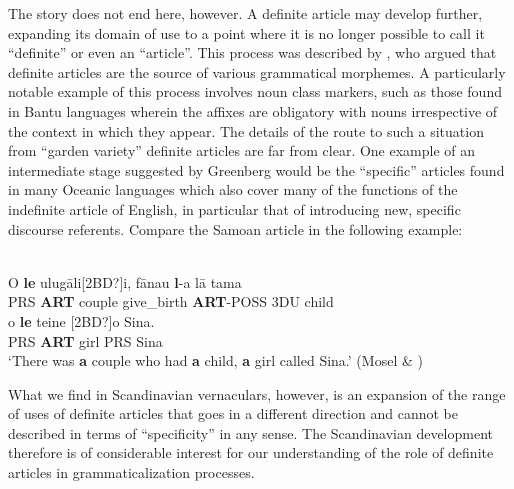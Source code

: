 The story does not end here, however. A definite article may develop further, expanding its domain of use to a point where it is no longer possible to call it “definite” or even an “article”. This process was described by \citet{Greenberg1978}, who argued that definite articles are the source of various grammatical morphemes.  A particularly notable example of this process involves noun class markers, such  as those found in Bantu languages wherein the affixes are obligatory with nouns irrespective of the context in which they appear. The details of the route to such a situation from “garden variety” definite articles are far from clear. One example of an intermediate stage suggested by Greenberg would be the “specific” articles found in many Oceanic languages which also cover many of the functions of the indefinite article of English, in particular that of introducing new, specific discourse referents. Compare the Samoan article  in the following example: 

\ea\label{}
\\
\gll	[2BD?]O  \textbf{le} ulug\=ali[2BD?]i,  f\=anau  \textbf{l}{}-a  l\=a  tama\\
		PRS  \textbf{ART} couple  give\_birth  \textbf{ART}{}-POSS  3DU  child\\
\gll	[2BD?]o  \textbf{le} teine  [2BD?]o  Sina.\\
		PRS  \textbf{ART} girl  PRS  Sina\\
\glt ‘There was \textbf{a} couple who had \textbf{a} child, \textbf{a} girl called Sina.’ (Mosel \& \citet[259]{Hovdhaugen1992})

\z

What we find in Scandinavian vernaculars, however, is an expansion of the range of uses of definite articles that goes in a different direction and cannot be described in terms of “specificity” in any sense. The Scandinavian development therefore is of considerable interest for our understanding of the role of definite articles in grammaticalization processes.




